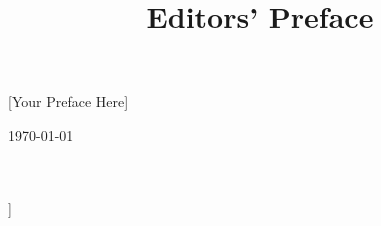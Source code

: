 \documentclass{dhbenelux}
\title{Editors' Preface}
\author{}
\begin{document}
\maketitle

\thispagestyle{papertitlepage} 

\section*{}
[Your Preface Here]

\bigskip

\noindent
\begin{minipage}[t]{.4\textwidth}
\today\\
[Places Where Editors Are]
\end{minipage}%
\hfill
\begin{minipage}[t]{.4\textwidth}\flushright
[Editor 1] \\
[Editor 2] \\
[etc.]]
\end{minipage}

\newpage\null\thispagestyle{empty}\newpage
\end{document}
